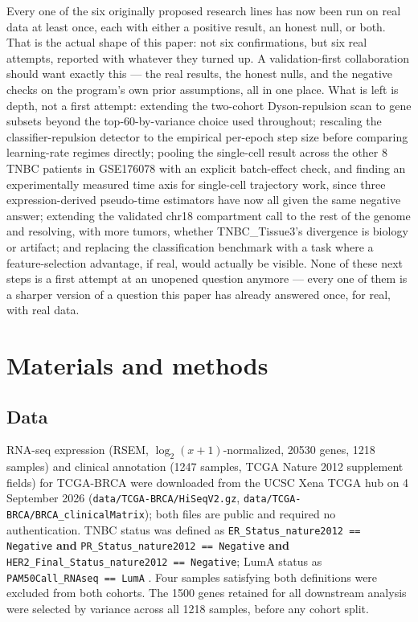 \documentclass[11pt]{article}
\begin{document}
Every one of the six originally proposed research lines has now been
run on real data at least once, each with either a positive result, an
honest null, or both. That is the actual shape of this paper: not six
confirmations, but six real attempts, reported with whatever they
turned up. A validation-first collaboration should want exactly this
--- the real results, the honest nulls, and the negative checks on the
program's own prior assumptions, all in one place. What is left is
depth, not a first attempt: extending the two-cohort Dyson-repulsion
scan to gene subsets beyond the top-60-by-variance choice used
throughout; rescaling the classifier-repulsion detector to the
empirical per-epoch step size before comparing learning-rate regimes
directly; pooling the single-cell result across the other 8 TNBC
patients in GSE176078 with an explicit batch-effect check, and finding
an experimentally measured time axis for single-cell trajectory work,
since three expression-derived pseudo-time estimators have now all
given the same negative answer; extending the validated chr18
compartment call to the rest of the genome and resolving, with more
tumors, whether TNBC\_Tissue3's divergence is biology or artifact; and
replacing the classification benchmark with a task where a
feature-selection advantage, if real, would actually be visible. None
of these next steps is a first attempt at an unopened question anymore
--- every one of them is a sharper version of a question this paper has
already answered once, for real, with real data.

\section{Materials and methods}

\subsection{Data}
\label{sec:cohorts-methods}

RNA-seq expression (RSEM, $\log_2(x+1)$-normalized, 20530 genes,
1218 samples) and clinical annotation (1247 samples, TCGA Nature 2012
supplement fields) for TCGA-BRCA were downloaded from the UCSC Xena
TCGA hub \citep{xena2020,tcga2012} on 4 September 2026
(\texttt{data/TCGA-BRCA/HiSeqV2.gz},
\texttt{data/TCGA-BRCA/BRCA\_clinicalMatrix}); both files are public
and required no authentication. TNBC status was defined as
\texttt{ER\_Status\_nature2012 == Negative} \textbf{and}
\texttt{PR\_Status\_nature2012 == Negative} \textbf{and}
\texttt{HER2\_Final\_Status\_nature2012 == Negative}; LumA status as
\texttt{PAM50Call\_RNAseq == LumA} \citep{pam502009}. Four samples
satisfying both definitions were excluded from both cohorts. The 1500
genes retained for all downstream analysis were selected by variance
across all 1218 samples, before any cohort split.
\end{document}
